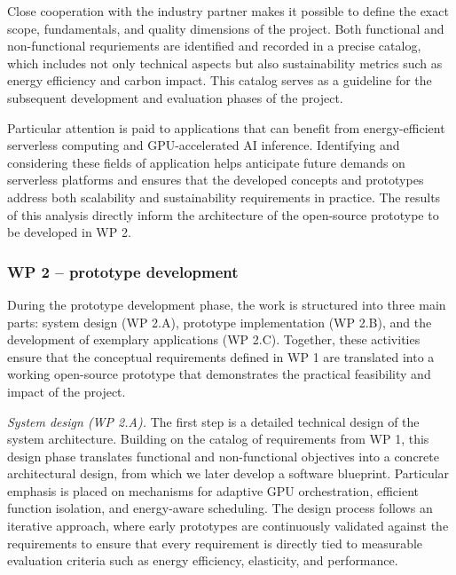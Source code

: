 Close cooperation with the industry partner makes it possible to define the exact scope, fundamentals, and quality dimensions of the project.
Both functional and non-functional requriements are identified and recorded in a precise catalog, which includes not only technical aspects but also sustainability metrics such as energy efficiency and carbon impact.
This catalog serves as a guideline for the subsequent development and evaluation phases of the project.

Particular attention is paid to applications that can benefit from energy-efficient serverless computing and GPU-accelerated AI inference.
Identifying and considering these fields of application helps anticipate future demands on serverless platforms and ensures that the developed concepts and prototypes address both scalability and sustainability requirements in practice.
The results of this analysis directly inform the architecture of the open-source prototype to be developed in WP 2.

\subsubsection{WP 2 -- prototype development}

During the prototype development phase, the work is structured into three main parts: system design (WP 2.A), prototype implementation (WP 2.B), and the development of exemplary applications (WP 2.C).
Together, these activities ensure that the conceptual requirements defined in WP 1 are translated into a working open-source prototype that demonstrates the practical feasibility and impact of the project.

\emph{System design (WP 2.A).}
The first step is a detailed technical design of the system architecture.
Building on the catalog of requirements from WP 1, this design phase translates functional and non-functional objectives into a concrete architectural design, from which we later develop a software blueprint.
Particular emphasis is placed on mechanisms for adaptive GPU orchestration, efficient function isolation, and energy-aware scheduling.
The design process follows an iterative approach, where early prototypes are continuously validated against the requirements to ensure that every requirement is directly tied to measurable evaluation criteria such as energy efficiency, elasticity, and performance.

